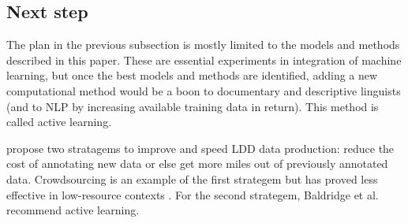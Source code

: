 \documentclass[12pt]{article}
\begin{document}


\subsection{Next step}

The plan in the previous subsection is mostly limited to the models and methods described in this paper. These are essential experiments in integration of machine learning, but once the best models and methods are identified, adding a new computational method would be a boon to documentary and descriptive linguists (and to NLP by increasing available training data in return). This method is called active learning. 

 propose two stratagems to improve and speed LDD data production: reduce the cost of annotating new data or else get more miles out of previously annotated data. Crowdsourcing is an example of the first strategem but has proved less effective in low-resource contexts \cite{bird_aikuma:_2014,bettinson_developing_2017}. For the second strategem, Baldridge et al. recommend active learning. 
\end{document}
